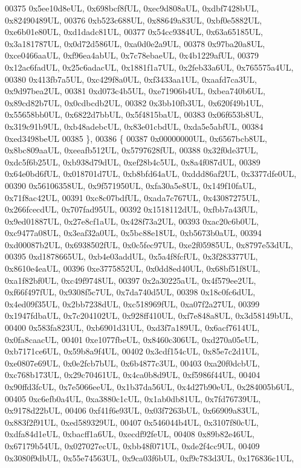 \begin{DoxyCode}
00375     0x5ee10d8eUL, 0x698bcf8fUL, 0xec9d808aUL, 0xdbf7428bUL, 0x82490489UL,
00376     0xb523c688UL, 0x88649a83UL, 0xbf0e5882UL, 0xe6b01e80UL, 0xd1dadc81UL,
00377     0x54cc9384UL, 0x63a65185UL, 0x3a181787UL, 0x0d72d586UL, 0xa0d0e2a9UL,
00378     0x97ba20a8UL, 0xce0466aaUL, 0xf96ea4abUL, 0x7c78ebaeUL, 0x4b1229afUL,
00379     0x12ac6fadUL, 0x25c6adacUL, 0x1881f1a7UL, 0x2feb33a6UL, 0x765575a4UL,
00380     0x413fb7a5UL, 0xc429f8a0UL, 0xf3433aa1UL, 0xaafd7ca3UL, 0x9d97bea2UL,
00381     0xd073c4b5UL, 0xe71906b4UL, 0xbea740b6UL, 0x89cd82b7UL, 0x0cdbcdb2UL,
00382     0x3bb10fb3UL, 0x620f49b1UL, 0x55658bb0UL, 0x6822d7bbUL, 0x5f4815baUL,
00383     0x06f653b8UL, 0x319c91b9UL, 0xb48adebcUL, 0x83e01cbdUL, 0xda5e5abfUL,
00384     0xed3498beUL
00385   \},
00386   \{
00387     0x00000000UL, 0x6567bcb8UL, 0x8bc809aaUL, 0xeeafb512UL, 0x5797628fUL,
00388     0x32f0de37UL, 0xdc5f6b25UL, 0xb938d79dUL, 0xef28b4c5UL, 0x8a4f087dUL,
00389     0x64e0bd6fUL, 0x018701d7UL, 0xb8bfd64aUL, 0xddd86af2UL, 0x3377dfe0UL,
00390     0x56106358UL, 0x9f571950UL, 0xfa30a5e8UL, 0x149f10faUL, 0x71f8ac42UL,
00391     0xc8c07bdfUL, 0xada7c767UL, 0x43087275UL, 0x266fcecdUL, 0x707fad95UL,
00392     0x1518112dUL, 0xfbb7a43fUL, 0x9ed01887UL, 0x27e8cf1aUL, 0x428f73a2UL,
00393     0xac20c6b0UL, 0xc9477a08UL, 0x3eaf32a0UL, 0x5bc88e18UL, 0xb5673b0aUL,
00394     0xd00087b2UL, 0x6938502fUL, 0x0c5fec97UL, 0xe2f05985UL, 0x8797e53dUL,
00395     0xd1878665UL, 0xb4e03addUL, 0x5a4f8fcfUL, 0x3f283377UL, 0x8610e4eaUL,
00396     0xe3775852UL, 0x0dd8ed40UL, 0x68bf51f8UL, 0xa1f82bf0UL, 0xc49f9748UL,
00397     0x2a30225aUL, 0x4f579ee2UL, 0xf66f497fUL, 0x9308f5c7UL, 0x7da740d5UL,
00398     0x18c0fc6dUL, 0x4ed09f35UL, 0x2bb7238dUL, 0xc518969fUL, 0xa07f2a27UL,
00399     0x1947fdbaUL, 0x7c204102UL, 0x928ff410UL, 0xf7e848a8UL, 0x3d58149bUL,
00400     0x583fa823UL, 0xb6901d31UL, 0xd3f7a189UL, 0x6acf7614UL, 0x0fa8caacUL,
00401     0xe1077fbeUL, 0x8460c306UL, 0xd270a05eUL, 0xb7171ce6UL, 0x59b8a9f4UL,
00402     0x3cdf154cUL, 0x85e7c2d1UL, 0xe0807e69UL, 0x0e2fcb7bUL, 0x6b4877c3UL,
00403     0xa20f0dcbUL, 0xc768b173UL, 0x29c70461UL, 0x4ca0b8d9UL, 0xf5986f44UL,
00404     0x90ffd3fcUL, 0x7e5066eeUL, 0x1b37da56UL, 0x4d27b90eUL, 0x284005b6UL,
00405     0xc6efb0a4UL, 0xa3880c1cUL, 0x1ab0db81UL, 0x7fd76739UL, 0x9178d22bUL,
00406     0xf41f6e93UL, 0x03f7263bUL, 0x66909a83UL, 0x883f2f91UL, 0xed589329UL,
00407     0x546044b4UL, 0x3107f80cUL, 0xdfa84d1eUL, 0xbacff1a6UL, 0xecdf92feUL,
00408     0x89b82e46UL, 0x67179b54UL, 0x027027ecUL, 0xbb48f071UL, 0xde2f4cc9UL,
00409     0x3080f9dbUL, 0x55e74563UL, 0x9ca03f6bUL, 0xf9c783d3UL, 0x176836c1UL,

\end{DoxyCode}

